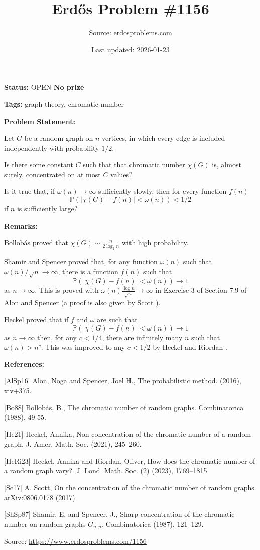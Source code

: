 \documentclass{article}
\title{Erd\H{o}s Problem \#1156}
\date{Last updated: 2026-01-23}
\author{Source: erdosproblems.com}
\begin{document}
\maketitle

\noindent\textbf{Status:} OPEN \quad \textbf{No prize}

\noindent\textbf{Tags:} graph theory, chromatic number

\medskip
\noindent\textbf{Problem Statement:}

Let $G$ be a random graph on $n$ vertices, in which every edge is included independently with probability $1/2$. 

Is there some constant $C$ such that that chromatic number $\chi(G)$ is, almost surely, concentrated on at most $C$ values? 

Is it true that, if $\omega(n)\to \infty$ sufficiently slowly, then for every function $f(n)$\[\mathbb{P}(\lvert\chi(G)-f(n)\rvert<\omega(n))<1/2\]if $n$ is sufficiently large?

\bigskip
\noindent\textbf{Remarks:}

Bollob\'{a}s \cite{Bo88} proved that $\chi(G) \sim \frac{n}{2\log_2n}$ with high probability.

Shamir and Spencer \cite{ShSp87} proved that, for any function $\omega(n)$ such that $\omega(n)/\sqrt{n}\to \infty$, there is a function $f(n)$ such that\[\mathbb{P}(\lvert\chi(G)-f(n)\rvert<\omega(n))\to 1\]as $n\to \infty$. This is proved with $\omega(n)\frac{\log n}{\sqrt{n}}\to \infty$ in Exercise 3 of Section 7.9 of Alon and Spencer \cite{AlSp16} (a proof is also given by Scott \cite{Sc17}).

Heckel \cite{He21} proved that if $f$ and $\omega$ are such that\[\mathbb{P}(\lvert\chi(G)-f(n)\rvert<\omega(n))\to 1\]as $n\to \infty$ then, for any $c<1/4$, there are infinitely many $n$ such that $\omega(n)>n^c$. This was improved to any $c<1/2$ by Heckel and Riordan \cite{HeRi23}.

\bigskip
\noindent\textbf{References:}

[AlSp16] Alon, Noga and Spencer, Joel H., The probabilistic method. (2016), xiv+375.
 
 [Bo88] Bollob\'{a}s, B., The chromatic number of random graphs. Combinatorica (1988), 49-55.
 
 [He21] Heckel, Annika, Non-concentration of the chromatic number of a random graph. J. Amer. Math. Soc. (2021), 245--260.
 
 [HeRi23] Heckel, Annika and Riordan, Oliver, How does the chromatic number of a random graph vary?. J. Lond. Math. Soc. (2) (2023), 1769--1815.
 
 [Sc17] A. Scott, On the concentration of the chromatic number of random graphs. arXiv:0806.0178 (2017).
 
 [ShSp87] Shamir, E. and Spencer, J., Sharp concentration of the chromatic number on random graphs
{$G_{n,p}$}. Combinatorica (1987), 121--129.

\bigskip
\noindent\small{Source: \url{https://www.erdosproblems.com/1156}}
\end{document}
